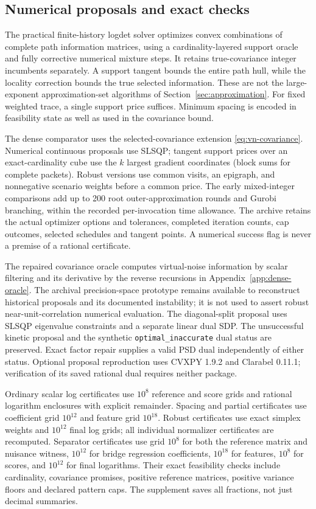 \subsection{Numerical proposals and exact checks}

The practical finite-history logdet solver optimizes convex combinations of
complete path information matrices, using a cardinality-layered support oracle
and fully corrective numerical mixture steps. It retains true-covariance
integer incumbents separately. A support tangent bounds the entire path hull,
while the locality correction bounds the true selected information. These are
not the large-exponent approximation-set algorithms of
Section~\ref{sec:approximation}. For fixed weighted trace, a single support
price suffices. Minimum spacing is encoded in feasibility state as well as
used in the covariance bound.

The dense comparator uses the selected-covariance extension
\eqref{eq:vn-covariance}. Numerical continuous proposals use SLSQP; tangent
support prices over an exact-cardinality cube use the $k$ largest gradient
coordinates (block sums for complete packets). Robust versions use common
visits, an epigraph, and nonnegative scenario weights before a common price.
The early mixed-integer comparisons add up to 200 root outer-approximation
rounds and Gurobi branching, within the recorded per-invocation time allowance.
The archive retains the actual optimizer options and tolerances, completed
iteration counts, cap outcomes, selected schedules and tangent points.
A numerical success flag is never a premise of a rational certificate.

The repaired covariance oracle computes virtual-noise information by scalar
filtering and its derivative by the reverse recursions in
Appendix~\ref{app:dense-oracle}. The archival precision-space prototype remains
available to reconstruct historical proposals and its documented instability;
it is not used to assert robust near-unit-correlation numerical evaluation.
The diagonal-split proposal uses SLSQP eigenvalue constraints and a separate
linear dual SDP. The unsuccessful kinetic proposal and the synthetic
\texttt{optimal\_inaccurate} dual status are preserved. Exact factor repair
supplies a valid PSD dual independently of either status. Optional proposal
reproduction uses CVXPY 1.9.2 and Clarabel 0.11.1; verification of its saved
rational dual requires neither package.

Ordinary scalar log certificates use $10^8$ reference and score grids and
rational logarithm enclosures with explicit remainder. Spacing and partial
certificates use coefficient grid $10^{12}$ and feature grid $10^{18}$.
Robust certificates use exact simplex weights and $10^{12}$ final log grids;
all individual normalizer certificates are recomputed. Separator certificates
use grid $10^8$ for both the reference matrix and nuisance witness,
$10^{12}$ for bridge regression coefficients, $10^{18}$ for features,
$10^8$ for scores, and $10^{12}$ for final logarithms. Their exact feasibility
checks include cardinality, covariance promises, positive reference matrices,
positive variance floors and declared pattern caps. The supplement saves
all fractions, not just decimal summaries.

